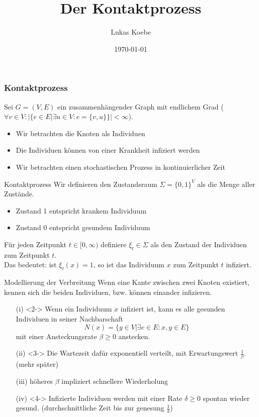 \documentclass[11pt]{beamer}
\title{Der Kontaktprozess}
\author{Lukas Koebe}
\institute{Technische Universit\"at M\"unchen}
\date{\today}
\begin{document}
\begin{frame}
\titlepage
\end{frame}

\begin{frame}
\frametitle{Kontaktprozess}
Sei $G = (V, E)$ ein zusammenhängender Graph mit endlichem Grad
($\forall v \in V : |\{ e \in E | \exists u \in V : e = \{v, u\} \}| < \infty$).
\begin{itemize}
    \item Wir betrachten die Knoten als Individuen
    \item Die Individuen können von einer Krankheit infiziert werden
    \item Wir betrachten einen stochastischen Prozess in kontinuierlicher Zeit
\end{itemize}
\end{frame}


\begin{frame}{Kontaktprozess}
Wir definieren den Zustandsraum $\Sigma = \{ 0, 1 \}^V$ als die Menge aller Zustände.
\begin{itemize}
    \item Zustand 1 entspricht krankem Individuum
    \item Zustand 0 entspricht gesundem Individuum
\end{itemize}
Für jeden Zeitpunkt $t \in [0, \infty)$ definiere $\xi_t \in \Sigma$ als
den Zustand der Individuen zum Zeitpunkt $t$.
\\
Das bedeutet: ist $\xi_t(x) = 1$, so ist das Individuum $x$ zum Zeitpunkt $t$ infiziert.
\end{frame}

\begin{frame}{Modellierung der Verbreitung}
    Wenn eine Kante zwischen zwei Knoten existiert, kennen sich die beiden Individuen,
    bzw. können einander infizieren.
    \begin{itemize}
        \item[(i)]<2-> 
            Wenn ein Individuum $x$ infiziert ist, kann es alle gesunden Individuen in seiner Nachbarschaft
            \begin{equation*}
                N(x) = \{ y \in V | \exists e \in E : {x, y} \in E \}
            \end{equation*}
            mit einer Ansteckungsrate $\beta \geq 0$ anstecken.
        \item[(ii)]<3->
            Die Wartezeit dafür exponentiell verteilt, mit Erwartungswert $\frac{1}{\beta}$. (mehr später) 
        \item[(iii)]
            höheres $\beta$ impliziert schnellere Wiederholung
        \item[(iv)]<4-> 
            Infizierte Individuen werden mit einer Rate $\delta \geq 0$ spontan wieder
            gesund. (durchschnittliche Zeit bis zur genesung $\frac{1}{\delta}$)
    \end{itemize}
     {
    }
\end{frame}
\end{document}
